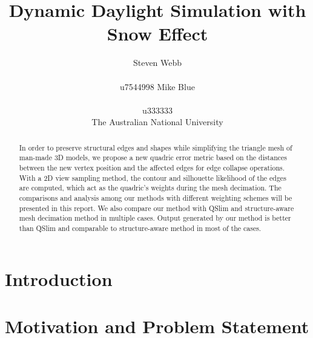 \documentclass{article}
\title{Dynamic Daylight Simulation with Snow Effect}
\author{%
  Steven Webb\\\\
  u7544998 
   \And
  Mike Blue\\\\
  u333333\\
  \AND  The Australian National University 
}
\begin{document}
\maketitle


\begin{abstract}
  In order to preserve structural edges and shapes while simplifying the triangle mesh of man-made 3D models, we propose a new quadric error metric based on the distances between the new vertex position and the affected edges for edge collapse operations. With a 2D view sampling method, the contour and silhouette likelihood of the edges are computed, which act as the quadric’s weights during the mesh decimation. The comparisons and analysis among our methods with different weighting schemes will be presented in this report. We also compare our method with QSlim  and structure-aware mesh decimation method in multiple cases. Output generated by our method is better than QSlim and comparable to structure-aware method in most of the cases. 
\end{abstract}


\section{Introduction}




\section{Motivation and Problem Statement}
\end{document}
